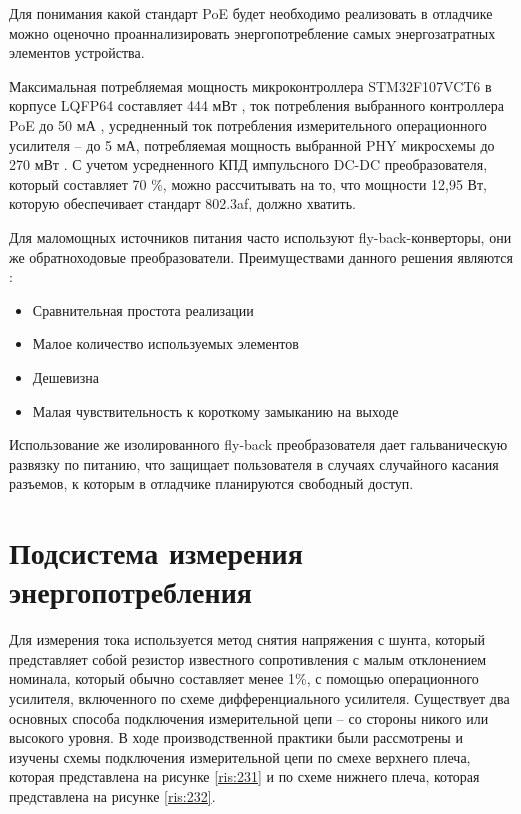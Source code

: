 Для понимания какой стандарт PoE будет необходимо реализовать в отладчике
можно оценочно проаннализировать энергопотребление самых энергозатратных элементов устройства.

Максимальная потребляемая мощность микроконтроллера STM32F107VCT6 в корпусе LQFP64 составляет 
444 мВт \cite{STM32:datasheet}, ток потребления выбранного контроллера PoE до 50 мА 
\cite{TPS2376:datasheet}, усредненный ток потребления измерительного операционного усилителя --
до 5 мА, потребляемая мощность выбранной PHY микросхемы до 270 мВт \cite{DP83848:datasheet}.
С учетом усредненного КПД импульсного DC-DC преобразователя, который составляет 70 \%, можно
рассчитывать на то, что мощности 12,95 Вт, которую обеспечивает стандарт 802.3af, должно хватить.

Для маломощных источников питания часто используют fly-back-конверторы, они же обратноходовые
преобразователи. Преимуществами данного решения являются \cite{PowerElectronic:FlyBack}:
\begin{itemize}
  \item Сравнительная простота реализации
  \item Малое количество используемых элементов
  \item Дешевизна
  \item Малая чувствительность к короткому замыканию на выходе
\end{itemize}

Использование же изолированного fly-back преобразователя дает гальваническую развязку по питанию,
что защищает пользователя в случаях случайного касания разъемов, к которым в отладчике 
планируются свободный доступ.

\section{Подсистема измерения энергопотребления}
\hspace{1cm} 

Для измерения тока используется метод снятия напряжения с шунта,
 который представляет собой резистор известного сопротивления с малым отклонением номинала,
 который обычно составляет менее 1\%, с помощью операционного
усилителя, включенного по схеме дифференциального усилителя.
Существует два основных способа подключения измерительной цепи – со стороны никого
или высокого уровня. В ходе производственной практики были рассмотрены и изучены схемы
подключения измерительной цепи по смехе верхнего плеча, которая представлена на рисунке
\ref{ris:231} и по схеме нижнего плеча, которая представлена на рисунке \ref{ris:232}.


